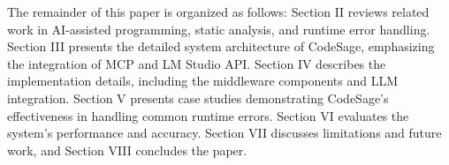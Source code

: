 The remainder of this paper is organized as follows: Section II reviews related work in AI-assisted programming, static analysis, and runtime error handling. Section III presents the detailed system architecture of CodeSage, emphasizing the integration of MCP and LM Studio API. Section IV describes the implementation details, including the middleware components and LLM integration. Section V presents case studies demonstrating CodeSage's effectiveness in handling common runtime errors. Section VI evaluates the system's performance and accuracy. Section VII discusses limitations and future work, and Section VIII concludes the paper. 